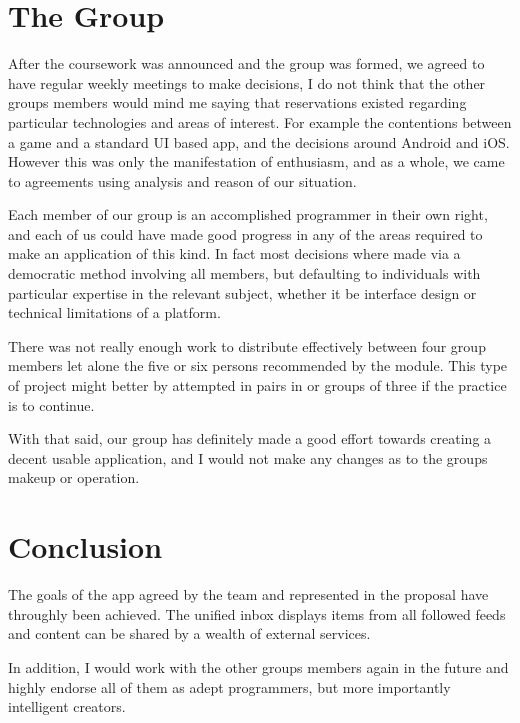 \documentclass[a4paper,11pt]{article}
\begin{document}
	\section{The Group}
    
	After the coursework was announced and the group was formed, we agreed to
	have regular weekly meetings to make decisions, I do not think that the
	other groups members would mind me saying that reservations existed
	regarding particular technologies and areas of interest. For example the
	contentions between a game and a standard UI based app, and the decisions
	around Android and iOS. However this was only the manifestation of
	enthusiasm, and as a whole, we came to agreements using analysis and
	reason of our situation.
	
	Each member of our group is an accomplished programmer in their own right,
	and each of us could have made good progress in any of the areas required
	to make an application of this kind. In fact most decisions where made via
	a democratic method involving all members, but defaulting to individuals
	with particular expertise in the relevant subject, whether it be interface
	design or technical limitations of a platform.
	
	There was not really enough work to distribute effectively between four
	group members let alone the five or six persons recommended by the module.
	This type of project might better by attempted in pairs in or groups of
	three if the practice is to continue.
	
	With that said, our group has definitely made a good effort towards
	creating a decent usable application, and I would not make any changes as
	to the groups makeup or operation.
	
	\section{Conclusion}
	
	The goals of the app agreed by the team and represented in the proposal
	have throughly been achieved. The unified inbox displays items from all
	followed feeds and content can be shared by a wealth of external services.
	
	In addition, I would work with the other groups members again in the
	future and highly endorse all of them as adept programmers, but more
	importantly intelligent creators.
\end{document}
